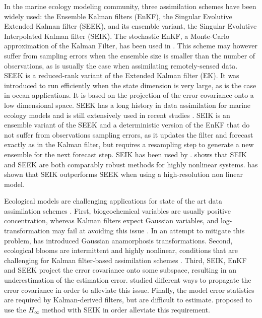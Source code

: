 In the marine ecology modeling community, three assimilation schemes have been
widely used: the Ensemble Kalman filters (EnKF), the Singular Evolutive
Extended Kalman filter (SEEK), and its ensemble variant, the Singular Evolutive
Interpolated Kalman filter (SEIK). The stochastic EnKF, a Monte-Carlo
approximation of the Kalman Filter, has been used in \citet{Ciavatta2011,
Ciavatta2014}. This scheme may however suffer from sampling errors when the
ensemble size is smaller than the number of observations, as is usually the
case when assimilating remotely-sensed data. SEEK is a reduced-rank variant of
the Extended Kalman filter (EK). It was introduced to run efficiently when the
state dimension is very large, as is the case in ocean applications. It is
based  on the projection of the error covariance onto a low dimensional space.
SEEK has a long history in data assimilation for marine ecology models and is
still extensively used in recent studies \citep{Fontana2013, Korres2012,
Butenschon2012}.  SEIK is an ensemble variant of the SEEK  and a deterministic
version of the EnKF that do not suffer from observations sampling errors, as it
updates the filter and forecast exactly as in the Kalman filter, but requires a
resampling step to generate a new ensemble for the next forecast step. SEIK has
been used by \citep{Triantafyllou2013, Korres2012}. \citet{Korres2012} shows
that SEIK and SEEK are both comparably robust methods for highly nonlinear
systems. \citet{Hoteit2005} has shown that SEIK outperforms SEEK when using a
high-resolution non linear model.

Ecological models are challenging applications for state of the art data
assimilation schemes \citep{Edwards2015}. First, biogeochemical variables are
usually positive concentration, whereas Kalman filters expect Gaussian
variables, and log-transformation may fail at avoiding this issue
\citep{Ciavatta2011}. In an attempt to mitigate this problem,
\citet{Fontana2013} has introduced Gaussian anamorphosis transformations.
Second, ecological blooms are intermittent and highly nonlinear, conditions
that are challenging for Kalman filter-based assimilation schemes
\citep{Triantafyllou2013, Korres2012}. Third, SEIK, EnKF and SEEK project the
error covariance onto some subspace, resulting in an underestimation of the
estimation error. \citet{Butenschon2012} studied different ways to propagate
the error covariance in order to alleviate this issue. Finally, the model error
statistics are required by Kalman-derived filters, but are difficult to
estimate. \citet{Triantafyllou2013} proposed to use the $H_\infty$ method with
SEIK in order alleviate this requirement.

